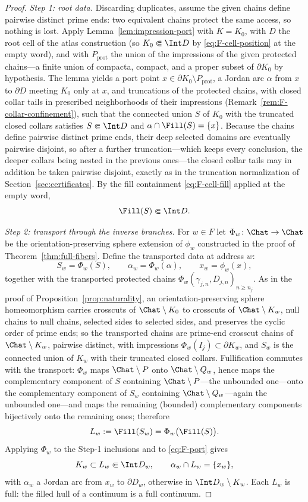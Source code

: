 \begin{proof}
\emph{Step 1: root data.}
Discarding duplicates, assume the given chains define pairwise distinct
prime ends: two equivalent chains protect the same access, so nothing is
lost.  Apply Lemma~\ref{lem:impression-port} with $K=K_0$, with $D$ the root
cell of the atlas construction (so $K_0\Subset\Int D$ by
\eqref{eq:F-cell-position} at the empty word), and with
$P_{\mathrm{prot}}$ the union of the impressions of the given protected
chains---a finite union of compacta, compact, and a proper subset of
$\partial K_0$ by hypothesis.  The lemma yields a port point
$x\in\partial K_0\setminus P_{\mathrm{prot}}$, a Jordan arc $\alpha$ from
$x$ to $\partial D$ meeting $K_0$ only at $x$, and truncations of the
protected chains, with closed collar tails in prescribed neighborhoods of
their impressions (Remark~\ref{rem:F-collar-confinement}), such that the
connected union $S$ of $K_0$ with the
truncated closed collars satisfies $S\Subset\Int D$ and
$\alpha\cap\Fill(S)=\{x\}$.  Because the chains define pairwise distinct
prime ends, their deep selected domains are eventually pairwise
disjoint, so after a further truncation---which keeps every conclusion,
the deeper collars being nested in the previous ones---the closed collar
tails may in addition be taken pairwise disjoint, exactly as in the
truncation normalization of Section~\ref{sec:certificates}.  By the fill
containment \eqref{eq:F-cell-fill} applied at the empty word,
\[
\Fill(S)\Subset\Int D .
\]

\emph{Step 2: transport through the inverse branches.}
For $w\in F$ let $\Phi_w\colon\Chat\to\Chat$ be the orientation-preserving
sphere extension of $\phi_w$ constructed in the proof of
Theorem~\ref{thm:full-fibers}.  Define the transported data at address
$w$:
\[
S_w=\Phi_w(S),\qquad
\alpha_w=\Phi_w(\alpha),\qquad
x_w=\phi_w(x),
\]
together with the transported protected chains
$\Phi_w(\gamma_{j,n},D_{j,n})_{n\ge n_j}$.  As in the proof of
Proposition~\ref{prop:naturality}, an orientation-preserving sphere
homeomorphism carries crosscuts of $\Chat\setminus K_0$ to crosscuts of
$\Chat\setminus K_w$, null chains to null chains, selected sides to
selected sides, and preserves the cyclic order of prime ends; so the
transported chains are prime-end crosscut chains of
$\Chat\setminus K_w$, pairwise distinct, with impressions
$\Phi_w(I_j)\subset\partial K_w$, and $S_w$ is the connected union of
$K_w$ with their truncated closed collars.  Fullification commutes with
the transport: $\Phi_w$ maps $\Chat\setminus P$ onto
$\Chat\setminus Q_w$, hence maps the complementary component of $S$
containing $\Chat\setminus P$---the unbounded one---onto the
complementary component of $S_w$ containing $\Chat\setminus Q_w$---again
the unbounded one---and maps the remaining (bounded) complementary
components bijectively onto the remaining ones; therefore
\[
L_w:=\Fill(S_w)=\Phi_w\bigl(\Fill(S)\bigr).
\]
Applying $\Phi_w$ to the Step-1 inclusions and to \eqref{eq:F-port}
gives
\[
K_w\subset L_w\Subset\Int D_w,
\qquad
\alpha_w\cap L_w=\{x_w\},
\]
with $\alpha_w$ a Jordan arc from $x_w$ to $\partial D_w$, otherwise in
$\Int D_w\setminus K_w$.  Each $L_w$ is full: the filled hull of a
continuum is a full continuum.


\end{proof}
